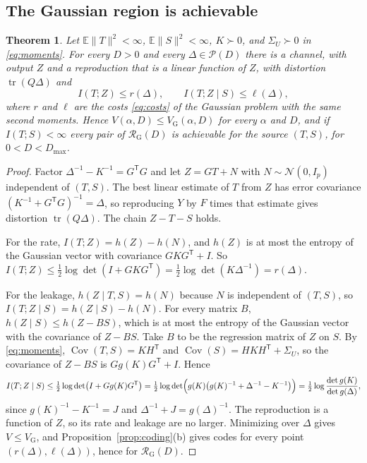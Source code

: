 \documentclass[11pt,onecolumn]{IEEEtran}
\newtheorem{theorem}{Theorem}
\newcommand{\E}{\mathbb{E}}
\newcommand{\tr}{\operatorname{tr}}
\newcommand{\Cov}{\operatorname{Cov}}
\newcommand{\VG}{V_{\mathrm G}}
\newcommand{\RG}{\mathcal R_{\mathrm G}}
\begin{document}
\subsection{The Gaussian region is achievable}

\begin{theorem}\label{thm:inner}
Let $\E\|T\|^2<\infty$, $\E\|S\|^2<\infty$, $K\succ0$, and
$\Sigma_U\succ0$ in \eqref{eq:moments}. For every $D>0$ and every
$\Delta\in\mathcal P(D)$ there is a channel, with output $Z$ and a
reproduction that is a linear function of $Z$, with distortion
$\tr(Q\Delta)$ and
\[
I(T;Z)\le r(\Delta),\qquad I(T;Z\mid S)\le\ell(\Delta),
\]
where $r$ and $\ell$ are the costs \eqref{eq:costs} of the Gaussian
problem with the same second moments. Hence
$V(\alpha,D)\le\VG(\alpha,D)$ for every $\alpha$ and $D$, and if
$I(T;S)<\infty$ every pair of $\RG(D)$ is achievable for the source
$(T,S)$, for $0<D<D_{\max}$.
\end{theorem}

\begin{proof}
Factor $\Delta^{-1}-K^{-1}=G^{\mathsf T}G$ and let $Z=GT+N$ with
$N\sim\mathcal N(0,I_p)$ independent of $(T,S)$. The best linear
estimate of $T$ from $Z$ has error covariance
$(K^{-1}+G^{\mathsf T}G)^{-1}=\Delta$, so reproducing $Y$ by $F$ times
that estimate gives distortion $\tr(Q\Delta)$. The chain $Z-T-S$ holds.

For the rate, $I(T;Z)=h(Z)-h(N)$, and $h(Z)$ is at most the entropy of
the Gaussian vector with covariance $GKG^{\mathsf T}+I$. So
$I(T;Z)\le\tfrac12\log\det(I+GKG^{\mathsf T})=\tfrac12\log\det(K\Delta^{-1})=r(\Delta)$.

For the leakage, $h(Z\mid T,S)=h(N)$ because $N$ is independent of
$(T,S)$, so $I(T;Z\mid S)=h(Z\mid S)-h(N)$. For every matrix $B$,
$h(Z\mid S)\le h(Z-BS)$, which is at most the entropy of the Gaussian
vector with the covariance of $Z-BS$. Take $B$ to be the regression
matrix of $Z$ on $S$. By \eqref{eq:moments}, $\Cov(T,S)=KH^{\mathsf T}$
and $\Cov(S)=HKH^{\mathsf T}+\Sigma_U$, so the covariance of $Z-BS$ is
$Gg(K)G^{\mathsf T}+I$. Hence
\[
I(T;Z\mid S)\le\tfrac12\log\det\bigl(I+Gg(K)G^{\mathsf T}\bigr)
=\tfrac12\log\det\Bigl(g(K)\bigl(g(K)^{-1}+\Delta^{-1}-K^{-1}\bigr)\Bigr)
=\tfrac12\log\frac{\det g(K)}{\det g(\Delta)},
\]
since $g(K)^{-1}-K^{-1}=J$ and $\Delta^{-1}+J=g(\Delta)^{-1}$. The
reproduction is a function of $Z$, so its rate and leakage are no
larger. Minimizing over $\Delta$ gives $V\le\VG$, and
Proposition~\ref{prop:coding}(b) gives codes for every point
$(r(\Delta),\ell(\Delta))$, hence for $\RG(D)$.
\end{proof}
\end{document}
